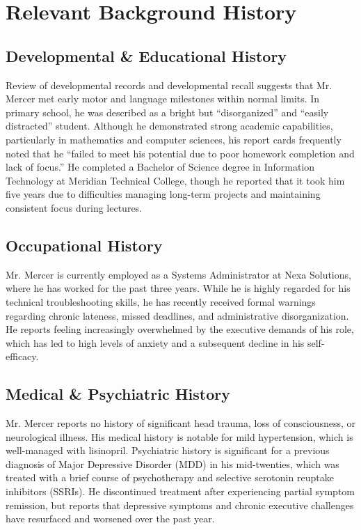 \section{Relevant Background History}

\subsection{Developmental \& Educational History}
Review of developmental records and developmental recall suggests that Mr. Mercer met early motor and language milestones within normal limits. In primary school, he was described as a bright but ``disorganized'' and ``easily distracted'' student. Although he demonstrated strong academic capabilities, particularly in mathematics and computer sciences, his report cards frequently noted that he ``failed to meet his potential due to poor homework completion and lack of focus.'' He completed a Bachelor of Science degree in Information Technology at Meridian Technical College, though he reported that it took him five years due to difficulties managing long-term projects and maintaining consistent focus during lectures.

\subsection{Occupational History}
Mr. Mercer is currently employed as a Systems Administrator at Nexa Solutions, where he has worked for the past three years. While he is highly regarded for his technical troubleshooting skills, he has recently received formal warnings regarding chronic lateness, missed deadlines, and administrative disorganization. He reports feeling increasingly overwhelmed by the executive demands of his role, which has led to high levels of anxiety and a subsequent decline in his self-efficacy.

\subsection{Medical \& Psychiatric History}
Mr. Mercer reports no history of significant head trauma, loss of consciousness, or neurological illness. His medical history is notable for mild hypertension, which is well-managed with lisinopril. Psychiatric history is significant for a previous diagnosis of Major Depressive Disorder (MDD) in his mid-twenties, which was treated with a brief course of psychotherapy and selective serotonin reuptake inhibitors (SSRIs). He discontinued treatment after experiencing partial symptom remission, but reports that depressive symptoms and chronic executive challenges have resurfaced and worsened over the past year.
